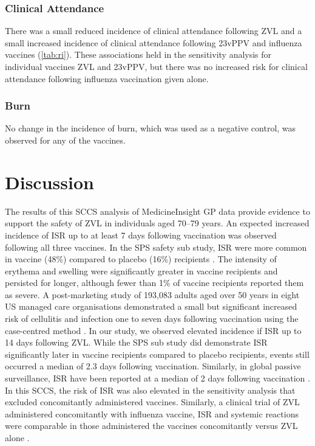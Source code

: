 \documentclass[review, endfloat]{elsarticle}
\begin{document}
\subsubsection{Clinical Attendance}

There was a small reduced incidence of clinical attendance following ZVL and a small increased incidence of clinical attendance following 23vPPV and influenza vaccines (\autoref{tab:ri}). These associations held in the sensitivity analysis for individual vaccines ZVL and 23vPPV, but there was no increased risk for clinical attendance following influenza vaccination given alone.

\subsubsection{Burn}

No change in the incidence of burn, which was used as a negative control, was observed for any of the vaccines.

\section{Discussion}

The results of this SCCS analysis of MedicineInsight GP data provide evidence to support the safety of ZVL in individuals aged 70–79 years. An expected increased incidence of ISR up to at least 7 days following vaccination was observed following all three vaccines. In the SPS safety sub study, ISR were more common in vaccine (48\%) compared to placebo (16\%) recipients \citep{simberkoff2010}. The intensity of erythema and swelling were significantly greater in vaccine recipients and persisted for longer, although fewer than 1\% of vaccine recipients reported them as severe. A post-marketing study of 193,083 adults aged over 50 years in eight US managed care organisations demonstrated a small but significant increased risk of cellulitis and infection one to seven days following vaccination using the case-centred method \citep{tseng2012}. In our study, we observed elevated incidence if ISR up to 14 days following ZVL. While the SPS sub study did demonstrate ISR significantly later in vaccine recipients compared to placebo recipients, events still occurred a median of 2.3 days following vaccination. Similarly, in global passive surveillance, ISR have been reported at a median of 2 days following vaccination \citep{willis2017herpes}. In this SCCS, the risk of ISR was also elevated in the sensitivity analysis that excluded concomitantly administered vaccines. Similarly, a clinical trial of ZVL administered concomitantly with influenza vaccine, ISR and systemic reactions were comparable in those administered the vaccines concomitantly versus ZVL alone \citep{levin2018immunogenicity}.
\end{document}
